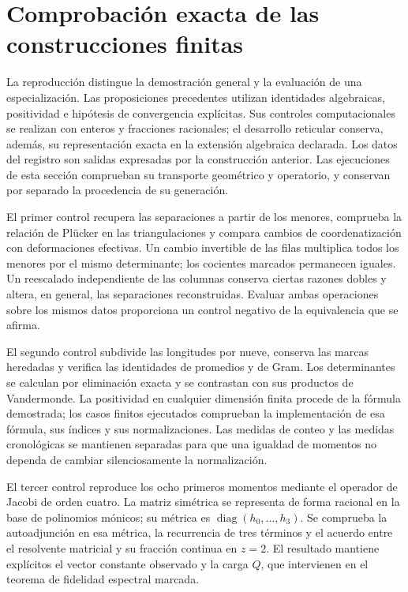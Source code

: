 \section{Comprobación exacta de las construcciones finitas}
\label{sec:exact-reproduction}

La reproducción distingue la demostración general y la evaluación de
una especialización. Las proposiciones precedentes utilizan identidades
algebraicas, positividad e hipótesis de convergencia explícitas. Sus
controles computacionales se realizan con enteros y fracciones racionales;
el desarrollo reticular conserva, además, su representación exacta en
la extensión algebraica declarada. Los datos del registro son salidas
expresadas por la construcción anterior. Las ejecuciones de esta
sección comprueban su transporte geométrico y operatorio, y conservan
por separado la procedencia de su generación.

El primer control recupera las separaciones a partir de los menores,
comprueba la relación de Plücker en las triangulaciones y compara
cambios de coordenatización con deformaciones efectivas. Un cambio invertible
de las filas multiplica todos los menores por el mismo determinante;
los cocientes marcados permanecen iguales. Un reescalado independiente
de las columnas conserva ciertas razones dobles y altera, en general,
las separaciones reconstruidas. Evaluar ambas operaciones sobre los
mismos datos proporciona un control negativo de la equivalencia
que se afirma.

El segundo control subdivide las longitudes por nueve, conserva las
marcas heredadas y verifica las identidades de promedios y de Gram.
Los determinantes se calculan por eliminación exacta y se contrastan
con sus productos de Vandermonde. La positividad en cualquier
dimensión finita procede de la fórmula demostrada; los casos finitos
ejecutados comprueban la implementación de esa fórmula, sus índices
y sus normalizaciones. Las medidas de conteo y las medidas
cronológicas se mantienen separadas para que una igualdad de
momentos no dependa de cambiar silenciosamente la normalización.

El tercer control reproduce los ocho primeros momentos mediante
el operador de Jacobi de orden cuatro. La matriz simétrica se
representa de forma racional en la base de polinomios mónicos;
su métrica es \(\operatorname{diag}(h_0,\ldots,h_3)\). Se
comprueba la autoadjunción en esa métrica, la recurrencia de tres
términos y el acuerdo entre el resolvente matricial y su fracción
continua en \(z=2\). El resultado mantiene explícitos el vector
constante observado y la carga \(Q\), que intervienen en el
teorema de fidelidad espectral marcada.


